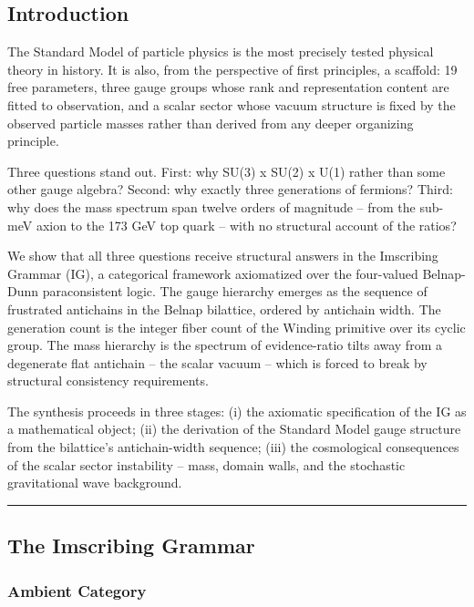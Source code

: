 \hypertarget{introduction}{%
\subsection{Introduction}\label{introduction}}

The Standard Model of particle physics is the most precisely tested
physical theory in history. It is also, from the perspective of first
principles, a scaffold: 19 free parameters, three gauge groups whose
rank and representation content are fitted to observation, and a scalar
sector whose vacuum structure is fixed by the observed particle masses
rather than derived from any deeper organizing principle.

Three questions stand out. First: why SU(3) x SU(2) x U(1) rather than
some other gauge algebra? Second: why exactly three generations of
fermions? Third: why does the mass spectrum span twelve orders of
magnitude -- from the sub-meV axion to the 173 GeV top quark -- with no
structural account of the ratios?

We show that all three questions receive structural answers in the
Imscribing Grammar (IG), a categorical framework axiomatized over the
four-valued Belnap-Dunn paraconsistent logic. The gauge hierarchy
emerges as the sequence of frustrated antichains in the Belnap
bilattice, ordered by antichain width. The generation count is the
integer fiber count of the Winding primitive over its cyclic group. The
mass hierarchy is the spectrum of evidence-ratio tilts away from a
degenerate flat antichain -- the scalar vacuum -- which is forced to
break by structural consistency requirements.

The synthesis proceeds in three stages: (i) the axiomatic specification
of the IG as a mathematical object; (ii) the derivation of the Standard
Model gauge structure from the bilattice's antichain-width sequence;
(iii) the cosmological consequences of the scalar sector instability --
mass, domain walls, and the stochastic gravitational wave background.

\begin{center}\rule{0.5\linewidth}{0.5pt}\end{center}

\hypertarget{the-imscribing-grammar}{%
\subsection{The Imscribing Grammar}\label{the-imscribing-grammar}}

\hypertarget{ambient-category}{%
\subsubsection{Ambient Category}\label{ambient-category}}

